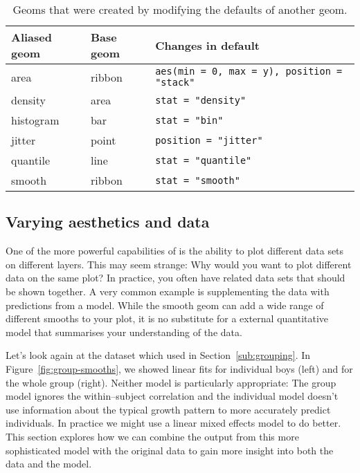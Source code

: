 \begin{table}
  \begin{center}
  \begin{tabular}{lll}
    \toprule
    Aliased geom & Base geom & Changes in default \\
    \midrule
    area      & ribbon & \verb!aes(min = 0, max = y), position = "stack"!  \\
    density   & area   & \verb!stat = "density"!    \\
    histogram & bar    & \verb!stat = "bin"!        \\
    jitter    & point  & \verb!position = "jitter"! \\
    quantile  & line   & \verb!stat = "quantile"!   \\
    smooth    & ribbon & \verb!stat = "smooth"!     \\
    \bottomrule
  \end{tabular}
  \end{center}
  \caption{Geoms that were created by modifying the defaults of another geom.}
  \label{tbl:aliased-geoms}
\end{table}

\subsection{Varying aesthetics and data}
\label{sub:different_aesthetics}

One of the more powerful capabilities of \ggplot is the ability to plot different data sets on different layers.  This may seem strange: Why would you want to plot different data on the same plot?  In practice, you often have related data sets that should be shown together.  A very common example is supplementing the data with predictions from a model.  While the smooth geom can add a wide range of different smooths to your plot, it is no substitute for a external quantitative model that summarises your understanding of the data.

Let's look again at the  dataset which used in Section~\ref{sub:grouping}.  In Figure~\ref{fig:group-smooths}, we showed linear fits for individual boys (left) and for the whole group (right).  Neither model is particularly appropriate: The group model ignores the within--subject correlation and the individual model doesn't use information about the typical growth pattern to more accurately predict individuals.  In practice we might use a linear mixed effects model to do better.  This section explores how we can combine the output from this more sophisticated model with the original data to gain more insight into both the data and the model.

